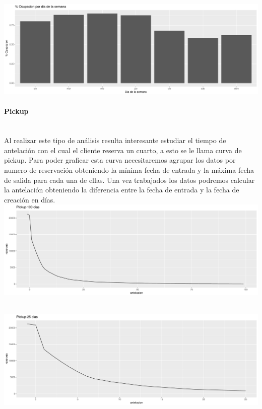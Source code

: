 \documentclass{article}\usepackage[]{graphicx}\usepackage[]{color}
\makeatletter
\def\maxwidth{ %
  \ifdim\Gin@nat@width>\linewidth
    \linewidth
  \else
    \Gin@nat@width
  \fi
}
\newenvironment{knitrout}{}{} %
\makeatother
\begin{document}
~\\
\begin{knitrout}
\color{fgcolor}
\includegraphics[width=\maxwidth]{figures/Ocupacion_Dia_Semana-1} 

\end{knitrout}
\paragraph{Pickup} ~\\
Al realizar este tipo de análisis resulta interesante estudiar el tiempo de antelación con el cual el cliente reserva un cuarto, a esto se le llama curva de pickup. Para poder graficar esta curva necesitaremos agrupar los datos por numero de reservación obteniendo la mínima fecha de entrada y la máxima fecha de salida para cada una de ellas. Una vez trabajados los datos podremos calcular la antelación obteniendo la diferencia entre la fecha de entrada y la fecha de creación en días.
~\\
\begin{knitrout}
\color{fgcolor}
\includegraphics[width=\maxwidth]{figures/pickup-1} 

\end{knitrout}
~\\
\begin{knitrout}
\color{fgcolor}
\includegraphics[width=\maxwidth]{figures/pickupzoom-1} 

\end{knitrout}
\end{document}
